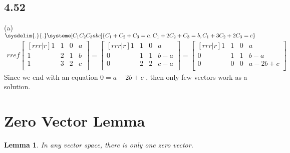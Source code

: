 \documentclass{report}
\newtheorem*{lemma}{Lemma}
\begin{document}
\subsection{4.52}
(a) 
$\sysdelim{.}{.}\systeme[C_1C_2C_3abc]{C_1+C_2+C_3 = a, C_1+2C_2+C_3 =b, C_1+3C_2+2C_3 = c}$
\begin{align*}
rref \begin{bmatrix}[rrr|r]
1&1&0&a\\ 1&2&1&b\\ 1&3&2&c\\
\end{bmatrix}
= \begin{bmatrix}[rrr|r] 1&1&0&a\\0&1&1&b-a\\0&2&2&c-a\\ \end{bmatrix}
=
\begin{bmatrix}[rrr|r] 1&1&0&a\\0&1&1&b-a\\0&0&0&a-2b+c\\ \end{bmatrix}
\end{align*}
Since we end with an equation $0 = a-2b+c$ , then only few vectors work as a solution.

\section{Zero Vector Lemma}
\begin{lemma} In any vector space, there is only one zero vector. \end{lemma}
\end{document}
